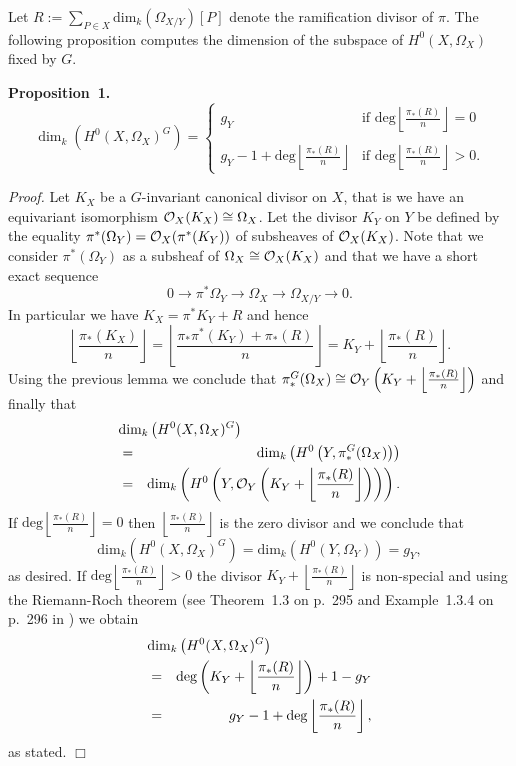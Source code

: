 \documentclass[12pt,leqno]{article}
\newcommand{\cO}{{\cal O}}
\begin{document}
Let $R := \sum_{P\in X} \textrm{dim}_k (\Omega_{X/Y}) [P]$
denote the ramification divisor of $\pi$. The following
proposition computes the dimension of the subspace of
$H^0(X,\Omega_X)$ fixed by $G$.


{\bf Proposition~1.}
\[\dim_k \left(H^0(X,\Omega_X)^G\right) = \left\{
\begin{array}{ll}
g_Y & \textrm{if } \textrm{deg} \left\lfloor \frac{\pi_*(R)}{n} \right\rfloor = 0\\
\\
g_Y-1 + \textrm{deg}\left\lfloor \frac{\pi_*(R)}{n} \right\rfloor &
\textrm{if } \textrm{deg}\left\lfloor \frac{\pi_*(R)}{n} \right\rfloor > 0.
\end{array}\right.\]


{\em Proof.} Let $K_X$ be a $G$-invariant canonical divisor on
$X$, that is we have an equivariant isomorphism $\cO_X(K_X)
\cong \Omega_X$. Let the divisor $K_Y$ on $Y$ be defined by the
equality $\pi^*(\Omega_Y) = \cO_X(\pi^*(K_Y))$ of subsheaves of
$\cO_X(K_X)$. Note that we consider $\pi^*(\Omega_Y)$ as a
subsheaf of $\Omega_X \cong \cO_X(K_X)$ and that we have a
short exact sequence
\[0 \rightarrow \pi^* \Omega_Y \rightarrow \Omega_X \rightarrow
\Omega_{X/Y} \rightarrow 0. \]
 In particular we have $K_X = \pi^* K_Y + R$ and hence
\[\left\lfloor \frac{\pi_*(K_X)}{n} \right \rfloor = \left
\lfloor \frac{\pi_*\pi^*(K_Y) + \pi_*(R)}{n} \right \rfloor =
K_Y + \left \lfloor \frac{\pi_*(R)}{n} \right\rfloor.\]
 Using the previous lemma we conclude that $\pi_*^G(\Omega_X) \cong
\cO_Y\left(K_Y + \left \lfloor
\frac{\pi_*(R)}{n}\right\rfloor\right)$ and finally that
\begin{eqnarray*}
\lefteqn{\textrm{dim}_k \left(H^0(X,\Omega_X)^G \right)}\\
& = & \textrm{dim}_k \left(H^0\left(Y, \pi_*^G(\Omega_X)\right)\right) \\
& = & \textrm{dim}_k
\left(H^0\left(Y, \cO_Y\left(K_Y+ \left\lfloor \frac{\pi_*(R)}{n}\right\rfloor \right) \right) \right).
\end{eqnarray*}
If $\textrm{deg}\left\lfloor \frac{\pi_*(R)}{n} \right \rfloor
= 0$ then $\left \lfloor \frac{\pi_*(R)}{n} \right\rfloor$ is
the zero divisor and we conclude that
\[\textrm{dim}_k\left(H^0(X,\Omega_X)^G\right) =
\textrm{dim}_k\left(H^0(Y, \Omega_Y)\right) = g_Y,\] as desired.
If $\textrm{deg}\left\lfloor \frac{\pi_*(R)}{n} \right \rfloor
> 0$ the divisor $K_Y + \left \lfloor \frac{\pi_*(R)}{n} \right
\rfloor$ is non-special and using the Riemann-Roch theorem (see
Theorem~1.3 on p.~295 and Example~1.3.4 on p.~296 in \cite{Ha})
we obtain
\begin{eqnarray*}
\lefteqn{\dim_k\left(H^0(X, \Omega_X)^G \right)}\\
& = & \textrm{deg}\left(K_Y + \left \lfloor \frac{\pi_*(R)}{n} \right \rfloor \right) + 1 - g_Y \\
& = & g_Y - 1 + \textrm{deg} \left \lfloor \frac{\pi_*(R)}{n} \right\rfloor ,
\end{eqnarray*}
as stated. \hfill $\Box$
\end{document}
